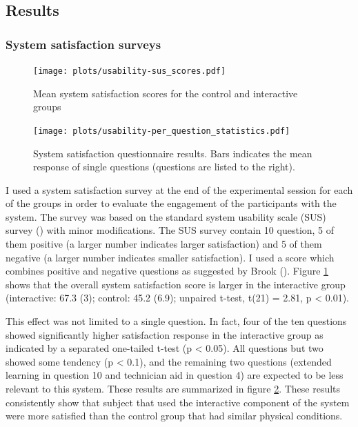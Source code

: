 \documentclass[a4paper,11pt]{article}
\begin{document}
{\subsection{Results}

\subsubsection{System satisfaction surveys}

\begin{figure}[!htb]
    \centering
    \texttt{[image: plots/usability-sus\_scores.pdf]}
    \caption{Mean system satisfaction scores for the control and interactive groups}\label{plot:usability-sus_scores}
\end{figure}

\begin{figure}[!htb]
    \centering
    \texttt{[image: plots/usability-per\_question\_statistics.pdf]}
    \caption{System satisfaction questionnaire results. Bars indicates the mean response of single questions (questions are listed to the right).}\label{plot:usability-per_question_statistics}
\end{figure}

I used a system satisfaction survey at the end of the experimental session for each of the groups in order to evaluate the engagement of the participants with the system.
The survey was based on the standard system usability scale (SUS) survey (\cite{brooke96}) with minor modifications.
The SUS survey contain 10 question, 5 of them positive (a larger number indicates larger satisfaction) and 5 of them negative (a larger number indicates smaller satisfaction).
I used a score which combines positive and negative questions as suggested by Brook (\cite*{brooke96}).
Figure \ref{plot:usability-sus_scores} shows that the overall system satisfaction score is larger in the interactive group (interactive: 67.3 (3); control: 45.2 (6.9); unpaired t-test, t(21) = 2.81, p \textless{} 0.01).

This effect was not limited to a single question.
In fact, four of the ten questions showed significantly higher satisfaction response in the interactive group as indicated by a separated one-tailed t-test (p \textless{} 0.05). All questions but two showed some tendency (p \textless{} 0.1), and the remaining two questions (extended learning in question 10 and technician aid in question 4) are expected to be less relevant to this system.
These results are summarized in figure \ref{plot:usability-per_question_statistics}.
These results consistently show that subject that used the interactive component of the system were more satisfied than the control group that had similar physical conditions.

}
\end{document}
